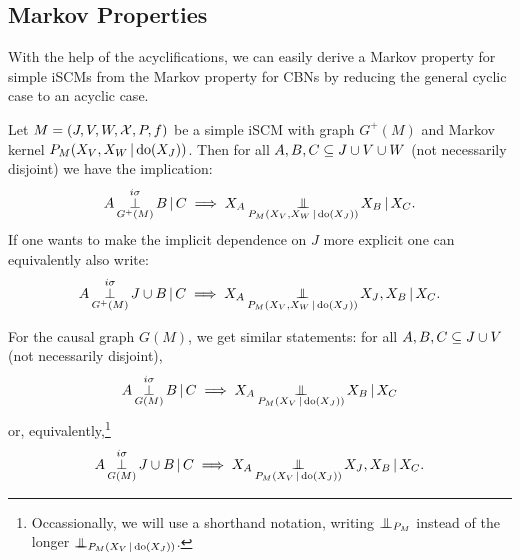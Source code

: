 \subsection{Markov Properties}

With the help of the acyclifications,
we can easily derive a Markov property for simple iSCMs from the Markov property for CBNs by reducing
the general cyclic case to an acyclic case.
\begin{Cor}\label{cor:gmp_simple_scm}
  Let $M = \left ( J, V, W, \mathcal{X}, P, f \right )$ be a simple iSCM with graph $G^+(M)$
  and Markov kernel $P_{M}(X_V,X_W \operatorname*{|} \operatorname{do}(X_J))$.
  Then for all $A, B, C \subseteq J \cup V \cup W$ (not necessarily disjoint) we have the implication:
  $$A \operatorname*{\perp}^{i\sigma}_{G^+(M)} B \operatorname*{|} C \implies X_A \operatorname*{\perp\mkern-11mu\perp}_{P_{M}(X_V,X_W \operatorname*{|} \operatorname{do}(X_{J}))} X_B \operatorname*{|} X_C.$$
  If one wants to make the implicit dependence on $J$ more explicit one can equivalently also write:
  $$A \operatorname*{\perp}^{i\sigma}_{G^+(M)} J \cup B \operatorname*{|} C \implies X_A \operatorname*{\perp\mkern-11mu\perp}_{P_{M}(X_V,X_W \operatorname*{|} \operatorname{do}(X_{J}))} X_J,X_B \operatorname*{|} X_C.$$

  For the causal graph $G(M)$, we get similar statements:
  for all $A, B, C \subseteq J \cup V$ (not necessarily disjoint),
  $$A \operatorname*{\perp}^{i\sigma}_{G(M)} B \operatorname*{|} C \implies X_A \operatorname*{\perp\mkern-11mu\perp}_{P_{M}(X_V \operatorname*{|} \operatorname{do}(X_{J}))} X_B \operatorname*{|} X_C$$
  or, equivalently,\footnote{Occassionally, we will use a shorthand notation, writing $\operatorname*{\perp\mkern-11mu\perp}_{P_{M}}$ instead of the longer $\operatorname*{\perp\mkern-11mu\perp}_{P_{M}(X_V \operatorname*{|} \operatorname{do}(X_J))}$.}
  $$A \operatorname*{\perp}^{i\sigma}_{G(M)} J \cup B \operatorname*{|} C \implies X_A \operatorname*{\perp\mkern-11mu\perp}_{P_{M}(X_V \operatorname*{|} \operatorname{do}(X_{J}))} X_J,X_B \operatorname*{|} X_C.$$
\end{Cor}
